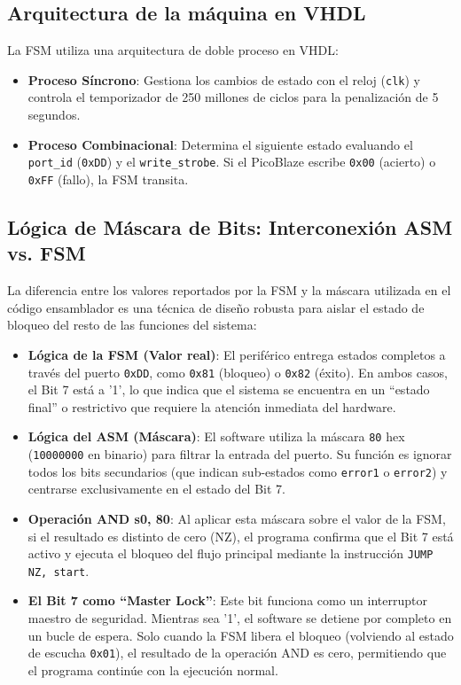 \documentclass[a4paper, 12pt]{report}
\begin{document}
\subsection{Arquitectura de la máquina en VHDL}

La FSM utiliza una arquitectura de doble proceso en VHDL:

\begin{itemize}
    \item \textbf{Proceso Síncrono}: Gestiona los cambios de estado con el reloj (\texttt{clk}) y controla el temporizador de 250 millones de ciclos para la penalización de 5 segundos.

    \item \textbf{Proceso Combinacional}: Determina el siguiente estado evaluando el \texttt{port\_id} (\texttt{0xDD}) y el \texttt{write\_strobe}. Si el PicoBlaze escribe \texttt{0x00} (acierto) o \texttt{0xFF} (fallo), la FSM transita.
\end{itemize}

\subsection{Lógica de Máscara de Bits: Interconexión ASM vs. FSM}

La diferencia entre los valores reportados por la FSM y la máscara utilizada en el código ensamblador es una técnica de diseño robusta para aislar el estado de bloqueo del resto de las funciones del sistema:

\begin{itemize}
    \item \textbf{Lógica de la FSM (Valor real)}: El periférico entrega estados completos a través del puerto \texttt{0xDD}, como \texttt{0x81} (bloqueo) o \texttt{0x82} (éxito). En ambos casos, el Bit 7 está a '1', lo que indica que el sistema se encuentra en un ``estado final'' o restrictivo que requiere la atención inmediata del hardware.

    \item \textbf{Lógica del ASM (Máscara)}: El software utiliza la máscara \texttt{80} hex (\texttt{10000000} en binario) para filtrar la entrada del puerto. Su función es ignorar todos los bits secundarios (que indican sub-estados como \texttt{error1} o \texttt{error2}) y centrarse exclusivamente en el estado del Bit 7.

    \item \textbf{Operación AND s0, 80}: Al aplicar esta máscara sobre el valor de la FSM, si el resultado es distinto de cero (NZ), el programa confirma que el Bit 7 está activo y ejecuta el bloqueo del flujo principal mediante la instrucción \texttt{JUMP NZ, start}.

    \item \textbf{El Bit 7 como ``Master Lock''}: Este bit funciona como un interruptor maestro de seguridad. Mientras sea '1', el software se detiene por completo en un bucle de espera. Solo cuando la FSM libera el bloqueo (volviendo al estado de escucha \texttt{0x01}), el resultado de la operación AND es cero, permitiendo que el programa continúe con la ejecución normal.
\end{itemize}
\end{document}
